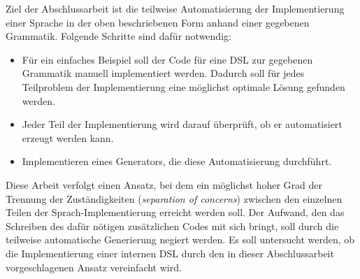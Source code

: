Ziel der Abschlussarbeit ist die teilweise Automatisierung der Implementierung einer Sprache in der oben beschriebenen Form anhand einer gegebenen Grammatik. Folgende Schritte sind dafür notwendig:
\begin{itemize}
	\item Für ein einfaches Beispiel soll der Code für eine DSL zur gegebenen Grammatik manuell implementiert werden. Dadurch soll für jedes Teilproblem der Implementierung eine möglichst optimale Lösung gefunden werden.
	\item Jeder Teil der Implementierung wird darauf überprüft, ob er automatisiert erzeugt werden kann.
	\item Implementieren eines Generators, die diese Automatisierung durchführt.
\end{itemize}

Diese Arbeit verfolgt einen Ansatz, bei dem ein möglichst hoher Grad der Trennung der Zuständigkeiten (\emph{separation of concerns}) zwischen den einzelnen Teilen der Sprach-Implementierung erreicht werden soll. Der Aufwand, den das Schreiben des dafür nötigen zusätzlichen Codes mit sich bringt, soll durch die teilweise automatische Generierung negiert werden.
Es soll untersucht werden, ob die Implementierung einer internen DSL durch den in dieser Abschlussarbeit vorgeschlagenen Ansatz vereinfacht wird.